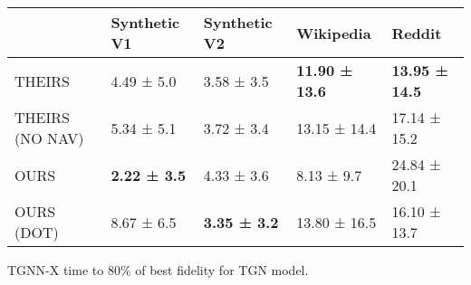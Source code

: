 \begin{tabular}{lllll}
\toprule
 & Synthetic V1 & Synthetic V2 & Wikipedia & Reddit \\
\midrule
THEIRS & 4.49 ± 5.0 & 3.58 ± 3.5 & \bfseries 11.90 ± 13.6 & \bfseries 13.95 ± 14.5 \\
THEIRS (NO NAV) & 5.34 ± 5.1 & 3.72 ± 3.4 & 13.15 ± 14.4 & 17.14 ± 15.2 \\
OURS & \bfseries 2.22 ± 3.5 & 4.33 ± 3.6 & 8.13 ± 9.7 & 24.84 ± 20.1 \\
OURS (DOT) & 8.67 ± 6.5 & \bfseries 3.35 ± 3.2 & 13.80 ± 16.5 & 16.10 ± 13.7 \\
\bottomrule
\end{tabular}
\caption{\label{tab:tgn_time}TGNN-X time to 80\% of best fidelity for TGN model.}

